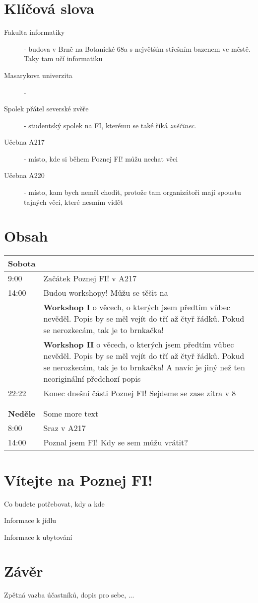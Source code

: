 \documentclass[]{article}
\begin{document}
\pagebreak
\section*{Klíčová slova}

\begin{description}
    \item[Fakulta informatiky] - budova v Brně na Botanické 68a s největším střešním bazenem ve městě. Taky tam učí informatiku
    \item[Masarykova univerzita] - 
    \item[Spolek přátel severské zvěře] - studentský spolek na FI, kterému se také říká \textit{zvěřinec}.
    \item[Učebna A217] - místo, kde si během Poznej FI! můžu nechat věci
    \item[Učebna A220] - místo, kam bych neměl chodit, protože tam organizátoři mají spoustu tajných věcí, které nesmím vidět
\end{description}

\pagebreak
\section*{Obsah}

    \begin{tabularx}{\textwidth}{lX}
        \textbf{Sobota} &  \\ \hline
        9:00 & Začátek Poznej FI! v A217 \\
        14:00 & Budou workshopy! Můžu se těšit na \\
        & \textbf{Workshop I} o věcech, o kterých jsem předtím vůbec nevěděl. Popis by se měl vejít do tří až čtyř řádků. Pokud se nerozkecám, tak je to brnkačka! \\
        & \textbf{Workshop II} o věcech, o kterých jsem předtím vůbec nevěděl. Popis by se měl vejít do tří až čtyř řádků. Pokud se nerozkecám, tak je to brnkačka! A navíc je jiný než ten neoriginální předchozí popis \\
        22:22 & Konec dnešní části Poznej FI! Sejdeme se zase zítra v 8 \\
        & \\ 
        & \\ 
        \textbf{Neděle} & Some more text \\ \hline
        8:00 & Sraz v A217 \\
        14:00 & Poznal jsem FI! Kdy se sem můžu vrátit? \\
    \end{tabularx}

\pagebreak
\section*{Vítejte na Poznej FI!}

Co budete potřebovat, kdy a kde

Informace k jídlu

Informace k ubytování



\pagebreak
\section*{Závěr}


Zpětná vazba účastníků, dopis pro sebe, ...
\end{document}
